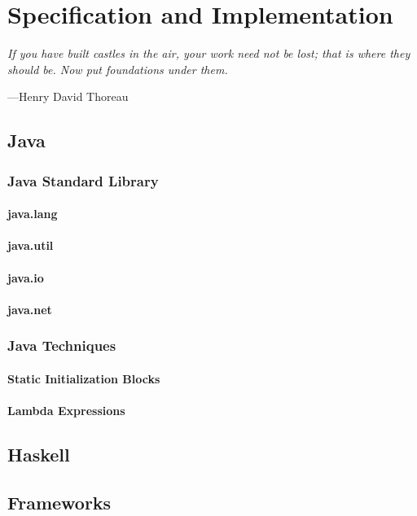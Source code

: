 \chapter{Specification and Implementation}

\vspace{4mm}
\begin{displayquote}
    \textit{If you have built castles in the air, your work need not be lost; that is where they should be. Now put foundations under them.}
    \begin{flushright}
        ---Henry David Thoreau
    \end{flushright}
\end{displayquote}
\vspace{4mm}

\section{Java}

\subsection{Java Standard Library}

\subsubsection{java.lang}

\subsubsection{java.util}

\subsubsection{java.io}

\subsubsection{java.net}

\subsection{Java Techniques}

\subsubsection{Static Initialization Blocks}

\subsubsection{Lambda Expressions}

\section{Haskell}

\section{Frameworks}

